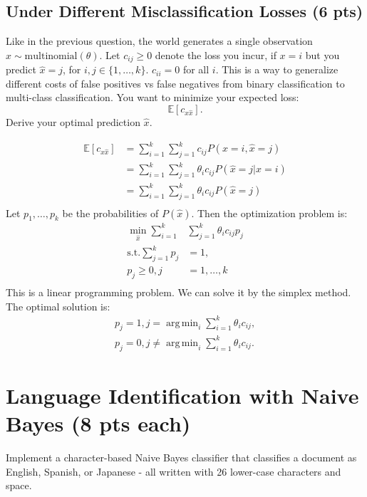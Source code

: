 \documentclass[10pt]{article}
\theoremstyle{definition}
\DeclareMathOperator*{\argmin}{arg\,min}
\def\E{\mathbb E}
\newenvironment{soln}{
    \leavevmode\color{blue}\ignorespaces
}{}
\begin{document}
\subsection{Under Different Misclassification Losses (6 pts)}
Like in the previous question, the world generates a single observation $x \sim \mbox{multinomial}(\theta)$. Let $c_{ij} \ge 0$ denote the loss you incur, if $x=i$ but you predict $\hat x=j$, for $i,j \in \{1, \ldots, k\}$.
$c_{ii}=0$ for all $i$. This is a way to generalize different costs of false positives vs false negatives from binary classification to multi-class classification. You want to minimize your expected loss:
$$\E[c_{x \hat x}].$$
Derive your optimal prediction $\hat x$.

\begin{soln}
    \begin{align*}
        \E[c_{x \hat x}] & = \sum_{i=1}^{k} \sum_{j=1}^{k} c_{ij} P(x = i, \hat x = j)           \\
                         & = \sum_{i=1}^{k} \sum_{j=1}^{k} \theta_i c_{ij} P(\hat x = j | x = i) \\
                         & = \sum_{i=1}^{k} \sum_{j=1}^{k} \theta_i c_{ij} P(\hat x = j)         \\
    \end{align*}
    Let $p_1, \dots , p_k$ be the probabilities of $P(\hat x)$. Then the optimization problem is:
    \begin{align*}
        \min_{\hat x} \sum_{i=1}^{k}   & \sum_{j=1}^{k} \theta_i c_{ij} p_j \\
        \text{s.t.} \sum_{j=1}^{k} p_j & = 1,                               \\
        p_j \ge 0, j                   & = 1, \dots , k                     \\
    \end{align*}
    This is a linear programming problem. We can solve it by the simplex method. The optimal solution is:
    \begin{align*}
        p_j = 1, j = \argmin_{i} \sum_{i=1}^{k} \theta_i c_{ij}, \\
        p_j = 0, j \neq \argmin_{i} \sum_{i=1}^{k} \theta_i c_{ij}.
    \end{align*}
\end{soln}


\section{Language Identification with Naive Bayes (8 pts each)}
Implement a character-based Naive Bayes classifier that classifies a document as English, Spanish, or Japanese - all written with 26 lower-case characters and space.
\end{document}
